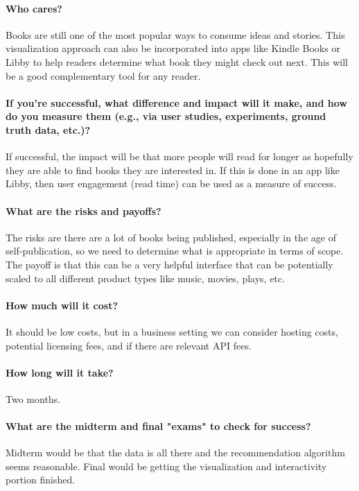 \paragraph{Who cares?}Books are still one of the most popular ways to consume ideas and stories. This visualization approach can also be incorporated into apps like Kindle Books or Libby to help readers determine what book they might check out next. This will be a good complementary tool for any reader.
 
\paragraph{If you're successful, what difference and impact will it make, and how do you measure them (e.g., via user studies, experiments, ground truth data, etc.)?}If successful, the impact will be that more people will read for longer as hopefully they are able to find books they are interested in. If this is done in an app like Libby, then user engagement (read time) can be used as a measure of success.
 
\paragraph{What are the risks and payoffs?}The risks are there are a lot of books being published, especially in the age of self-publication, so we need to determine what is appropriate in terms of scope. The payoff is that this can be a very helpful interface that can be potentially scaled to all different product types like music, movies, plays, etc.

\paragraph{How much will it cost?}It should be low costs, but in a business setting we can consider hosting costs, potential licensing fees, and if there are relevant API fees.
 
\paragraph{How long will it take?}Two months.
 
\paragraph{What are the midterm and final "exams" to check for success?}Midterm would be that the data is all there and the recommendation algorithm seems reasonable. Final would be getting the visualization and interactivity portion finished.
 
